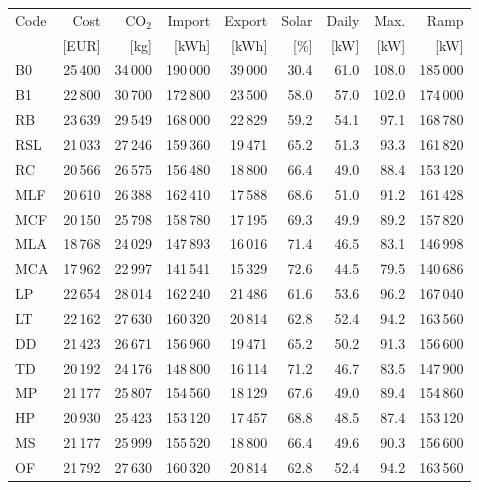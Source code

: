\clearpage
\noindent\begin{minipage}{\textwidth}\singlespacing\captionsetup{font=footnotesize}
\setlength{\tabcolsep}{4pt}
\renewcommand{\arraystretch}{1.0}
\label{tab:full-scorecard-1-0}
\fontsize{8}{9}\selectfont
\begin{tabular*}{\textwidth}{@{\extracolsep{\fill}}lrrrrrrrr@{}}
\toprule
Code & Cost & CO$_2$ & Import & Export & Solar & Daily & Max. & Ramp\\
 & [EUR] & [kg] & [kWh] & [kWh] & [\%] & [kW] & [kW] & [kW]\\
\midrule
B0 & 25\,400 & 34\,000 & 190\,000 & 39\,000 & 30.4 & 61.0 & 108.0 & 185\,000\\
B1 & 22\,800 & 30\,700 & 172\,800 & 23\,500 & 58.0 & 57.0 & 102.0 & 174\,000\\
RB & 23\,639 & 29\,549 & 168\,000 & 22\,829 & 59.2 & 54.1 & 97.1 & 168\,780\\
RSL & 21\,033 & 27\,246 & 159\,360 & 19\,471 & 65.2 & 51.3 & 93.3 & 161\,820\\
RC & 20\,566 & 26\,575 & 156\,480 & 18\,800 & 66.4 & 49.0 & 88.4 & 153\,120\\
MLF & 20\,610 & 26\,388 & 162\,410 & 17\,588 & 68.6 & 51.0 & 91.2 & 161\,428\\
MCF & 20\,150 & 25\,798 & 158\,780 & 17\,195 & 69.3 & 49.9 & 89.2 & 157\,820\\
MLA & 18\,768 & 24\,029 & 147\,893 & 16\,016 & 71.4 & 46.5 & 83.1 & 146\,998\\
MCA & 17\,962 & 22\,997 & 141\,541 & 15\,329 & 72.6 & 44.5 & 79.5 & 140\,686\\
LP & 22\,654 & 28\,014 & 162\,240 & 21\,486 & 61.6 & 53.6 & 96.2 & 167\,040\\
LT & 22\,162 & 27\,630 & 160\,320 & 20\,814 & 62.8 & 52.4 & 94.2 & 163\,560\\
DD & 21\,423 & 26\,671 & 156\,960 & 19\,471 & 65.2 & 50.2 & 91.3 & 156\,600\\
TD & 20\,192 & 24\,176 & 148\,800 & 16\,114 & 71.2 & 46.7 & 83.5 & 147\,900\\
MP & 21\,177 & 25\,807 & 154\,560 & 18\,129 & 67.6 & 49.0 & 89.4 & 154\,860\\
HP & 20\,930 & 25\,423 & 153\,120 & 17\,457 & 68.8 & 48.5 & 87.4 & 153\,120\\
MS & 21\,177 & 25\,999 & 155\,520 & 18\,800 & 66.4 & 49.6 & 90.3 & 156\,600\\
OF & 21\,792 & 27\,630 & 160\,320 & 20\,814 & 62.8 & 52.4 & 94.2 & 163\,560\\

\end{tabular*}
\end{minipage}
